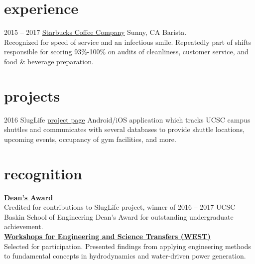 \documentclass[]{friggeri-cv}
\begin{document}
\section{experience}
\begin{entrylist}
\entry
    {2015 -- 2017}
    {\href{http://wisequacks.org/wp2/wp-content/uploads/2012/05/coffee.jpg}{Starbucks Coffee Company}}
    {Sunny, CA}
    {{\rolefont Barista.}\\Recognized for speed of service and an infectious smile.
    Repeatedly part of shifts responsible for scoring 93\%-100\% on audits of
    cleanliness, customer service, and food \& beverage preparation.}
\end{entrylist}\vspace{-1.5em}
\section{projects}%
\begin{entrylist}
  \entry
    {2016}
    {SlugLife}
    {\href{https://sites.google.com/a/ucsc.edu/sluglife/}{project page}}
    {Android/iOS application which tracks UCSC campus shuttles and
    communicates with several databases to provide shuttle locations, upcoming
    events, occupancy of gym facilities, and more.}
\end{entrylist}\vspace{-1.5em}
%
\section{recognition}
    {\href{http://honors.ucsc.edu/awards/dca/index.html}{\bf Dean's Award}}\\
    Credited for contributions to SlugLife project, winner of
    2016 -- 2017 UCSC Baskin School of Engineering Dean's Award for outstanding
    undergraduate achievement.%
    \newline\\
    {\href{http://isee.ucsc.edu/programs/west/index.html}%
    {\bf Workshops for Engineering and Science Transfers (WEST)}}\\
    {Selected for participation. Presented findings from applying 
    engineering methods to fundamental concepts in hydrodynamics and 
    water-driven power generation.}
\end{document}
